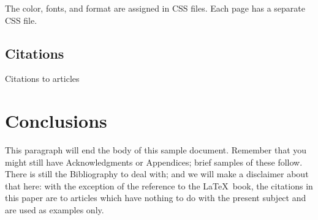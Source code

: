 The color, fonts, and format are assigned in CSS files. Each page has a separate CSS file. 

\subsection{Citations}
Citations to articles

\section{Conclusions}
This paragraph will end the body of this sample document.
Remember that you might still have Acknowledgments or
Appendices; brief samples of these
follow.  There is still the Bibliography to deal with; and
we will make a disclaimer about that here: with the exception
of the reference to the \LaTeX\ book, the citations in
this paper are to articles which have nothing to
do with the present subject and are used as
examples only.



